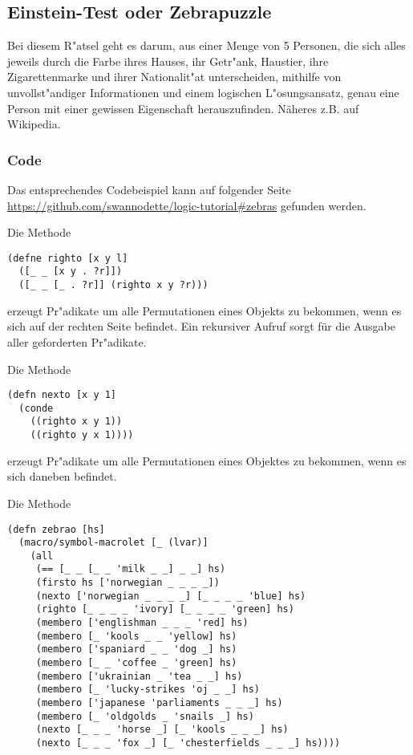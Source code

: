 \subsection{Einstein-Test oder Zebrapuzzle}

Bei diesem R"atsel geht es darum, aus einer Menge von 5 Personen, die sich alles jeweils durch die Farbe ihres Hauses, ihr Getr"ank, Haustier, ihre Zigarettenmarke und ihrer Nationalit"at unterscheiden, mithilfe von unvollst"andiger Informationen und einem logischen L"osungsansatz, genau eine Person mit einer gewissen Eigenschaft herauszufinden. Näheres z.B. auf Wikipedia.

\subsubsection{Code}

Das entsprechendes Codebeispiel kann auf folgender Seite \url{https://github.com/swannodette/logic-tutorial#zebras} gefunden werden.

Die Methode 

\begin{lstlisting}
(defne righto [x y l]
  ([_ _ [x y . ?r]])
  ([_ _ [_ . ?r]] (righto x y ?r)))
\end{lstlisting}

erzeugt Pr"adikate um alle Permutationen eines Objekts zu bekommen, wenn es sich auf der rechten Seite befindet. Ein rekursiver Aufruf sorgt für die Ausgabe aller geforderten Pr"adikate.

Die Methode 

\begin{lstlisting}
(defn nexto [x y 1]
  (conde
    ((righto x y 1))
    ((righto y x 1))))
\end{lstlisting}

erzeugt Pr"adikate um alle Permutationen eines Objektes zu bekommen, wenn es sich daneben befindet.

Die Methode 

\begin{lstlisting}
(defn zebrao [hs]
  (macro/symbol-macrolet [_ (lvar)]
    (all
     (== [_ _ [_ _ 'milk _ _] _ _] hs)
     (firsto hs ['norwegian _ _ _ _])
     (nexto ['norwegian _ _ _ _] [_ _ _ _ 'blue] hs)
     (righto [_ _ _ _ 'ivory] [_ _ _ _ 'green] hs)
     (membero ['englishman _ _ _ 'red] hs)
     (membero [_ 'kools _ _ 'yellow] hs)
     (membero ['spaniard _ _ 'dog _] hs)
     (membero [_ _ 'coffee _ 'green] hs)
     (membero ['ukrainian _ 'tea _ _] hs)
     (membero [_ 'lucky-strikes 'oj _ _] hs)
     (membero ['japanese 'parliaments _ _ _] hs)
     (membero [_ 'oldgolds _ 'snails _] hs)
     (nexto [_ _ _ 'horse _] [_ 'kools _ _ _] hs)
     (nexto [_ _ _ 'fox _] [_ 'chesterfields _ _ _] hs))))
\end{lstlisting}

